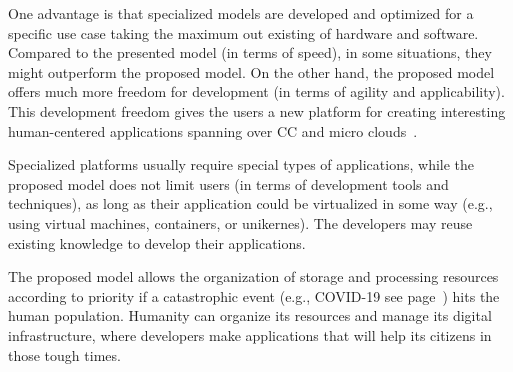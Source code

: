 One advantage is that specialized models are developed and optimized for a specific use case taking the maximum out existing of hardware and software. Compared to the presented model (in terms of speed), in some situations, they might outperform the proposed model. On the other hand, the proposed model offers much more freedom for development (in terms of agility and applicability). This development freedom gives the users a new platform for creating interesting human-centered applications spanning over CC and micro clouds~\cite{VillariCF17}.

Specialized platforms usually require special types of applications, while the proposed model does not limit users (in terms of development tools and techniques), as long as their application could be virtualized in some way (e.g., using virtual machines, containers, or unikernes). The developers may reuse existing knowledge to develop their applications.

The proposed model allows the organization of storage and processing resources according to priority if a catastrophic event (e.g., COVID-19 see page~\pageref{sec:covid_example}) hits the human population. Humanity can organize its resources and manage its digital infrastructure, where developers make applications that will help its citizens in those tough times.
%
%